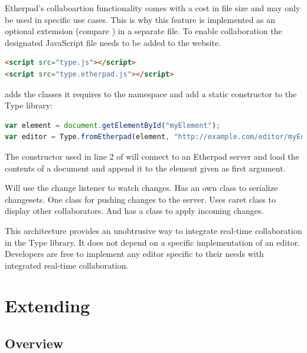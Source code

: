 Etherpad's collaboartion functionality comes with a cost in file size and may only be used in specific use cases. This is why this feature is implemented as an optional extemsion (compare ) in a separate file. To enable collaboration the designated JavaScript file needs to be added to the website.

\begin{lstlisting}[language=html, caption=Enabling real-time collaboration to Type, label=lst:add_etherpad_html]
<script src="type.js"></script>
<script src="type.etherpad.js"></script>
\end{lstlisting}

 adds the classes it requires to the  namespace and add a static constructor to the Type library:

\begin{lstlisting}[language=JavaScript, caption=Factory method to generate a collaborative Type instance, label=lst:etherpad_constructor]
var element = document.getElementById("myElement");
var editor = Type.fromEtherpad(element, "http://example.com/editor/myEditorId");
\end{lstlisting}

The constructor used in line 2 of  will connect to an Etherpad server and load the contents of a document and append it to the element given as first argument.

Will use the change listener to watch changes. Has an own class to serialize changesets. One class for pushing changes to the server. Uses caret class to display other collaborators. And has a class to apply incoming changes.

This architecture provides an unobtrusive way to integrate real-time collaboration in the Type library. It does not depend on a specific implementation of an editor. Developers are free to implement any editor specific to their needs with integrated real-time collaboration.




\section{Extending}
\label{sec:extensions}

\subsection{Overview}

